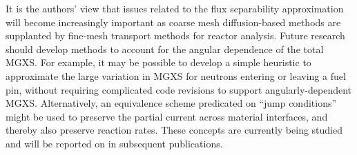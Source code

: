 It is the authors' view that issues related to the flux separability approximation will become increasingly important as coarse mesh diffusion-based methods are supplanted by fine-mesh transport methods for reactor analysis. Future research should develop methods to account for the angular dependence of the total MGXS. For example, it may be possible to develop a simple heuristic to approximate the large variation in MGXS for neutrons entering or leaving a fuel pin, without requiring complicated code revisions to support angularly-dependent MGXS. Alternatively, an equivalence scheme predicated on ``jump conditions'' might be used to preserve the partial current across material interfaces, and thereby also preserve reaction rates. These concepts are currently being studied and will be reported on in subsequent publications.

